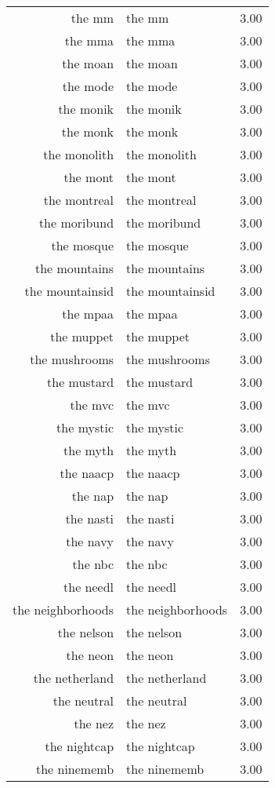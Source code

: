 \begin{table}[ht]
\begin{tabular}{rlr}
  the mm & the mm & 3.00 \\ 
  the mma & the mma & 3.00 \\ 
  the moan & the moan & 3.00 \\ 
  the mode & the mode & 3.00 \\ 
  the monik & the monik & 3.00 \\ 
  the monk & the monk & 3.00 \\ 
  the monolith & the monolith & 3.00 \\ 
  the mont & the mont & 3.00 \\ 
  the montreal & the montreal & 3.00 \\ 
  the moribund & the moribund & 3.00 \\ 
  the mosque & the mosque & 3.00 \\ 
  the mountains & the mountains & 3.00 \\ 
  the mountainsid & the mountainsid & 3.00 \\ 
  the mpaa & the mpaa & 3.00 \\ 
  the muppet & the muppet & 3.00 \\ 
  the mushrooms & the mushrooms & 3.00 \\ 
  the mustard & the mustard & 3.00 \\ 
  the mvc & the mvc & 3.00 \\ 
  the mystic & the mystic & 3.00 \\ 
  the myth & the myth & 3.00 \\ 
  the naacp & the naacp & 3.00 \\ 
  the nap & the nap & 3.00 \\ 
  the nasti & the nasti & 3.00 \\ 
  the navy & the navy & 3.00 \\ 
  the nbc & the nbc & 3.00 \\ 
  the needl & the needl & 3.00 \\ 
  the neighborhoods & the neighborhoods & 3.00 \\ 
  the nelson & the nelson & 3.00 \\ 
  the neon & the neon & 3.00 \\ 
  the netherland & the netherland & 3.00 \\ 
  the neutral & the neutral & 3.00 \\ 
  the nez & the nez & 3.00 \\ 
  the nightcap & the nightcap & 3.00 \\ 
  the ninememb & the ninememb & 3.00 \\ 

\end{tabular}
\end{table}
